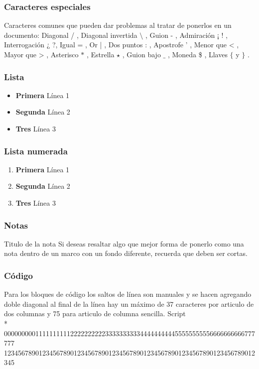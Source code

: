 \subsubsection*{Caracteres especiales}
Caracteres comunes que pueden dar problemas al tratar de ponerlos en un documento:
Diagonal / , 									Diagonal invertida $\setminus$ ,
Guion - ,										Admiración  ¡ ! ,
Interrogación ¿ ?,							Igual = ,
Or | ,											Dos puntos : ,
Apostrofe ' ,									Menor que < ,
Mayor que > ,									Asterisco $\ast$ ,
Estrella $\star$ ,							Guion bajo $\_$ ,
Moneda \$ ,										Llaves $\{$ y $\}$
.

\subsubsection*{Lista}
\begin{itemize}
   \item \textbf{Primera} Línea 1
   \item \textbf{Segunda} Línea 2
   \item \textbf{Tres} Línea 3
\end{itemize}

\subsubsection*{Lista numerada}
\begin{enumerate}
   \item \textbf{Primera} Línea 1
   \item \textbf{Segunda} Línea 2
   \item \textbf{Tres} Línea 3
\end{enumerate}

\subsubsection*{Notas}
\Remark
   {Titulo de la nota}
   {Si deseas resaltar algo que mejor forma de ponerlo como una nota dentro
   de un marco con un fondo diferente, recuerda que deben ser cortas.}

\subsubsection*{Código}
Para los bloques de código los saltos de línea son manuales y se hacen agregando
doble diagonal al final de la línea hay un máximo de 37 caracteres por articulo
de dos columnas y 75 para articulo de columna sencilla.
\Code
   {Script}
   {
   \\*
   000000000111111111122222222223333333333444444444455555555556666666666777777\\
   123456789012345678901234567890123456789012345678901234567890123456789012345\\
  }

